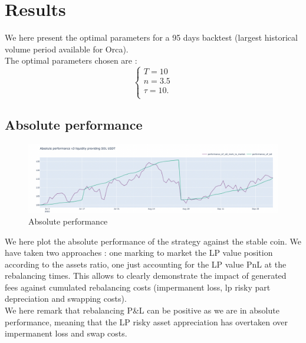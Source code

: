 \documentclass[conference]{IEEEtran}
\begin{document}
\section{Results}\label{result}
We here present the optimal parameters for a 95 days backtest (largest historical volume period available for Orca).\\
The optimal parameters chosen are :
\begin{equation}
\left\{\begin{array}{lll}
T = 10\\
n = 3.5\\
\tau = 10.\\
\end{array}
\right.
\end{equation}
\subsection{Absolute performance}
\begin{figure}[h!]
    \centering
    \includegraphics[scale=0.2]{Plots/absolute_lp_perf.png}
    \caption{Absolute performance}
    \label{fig:conc_liquidity}
\end{figure}
We here plot the absolute performance of the strategy against the stable coin. We have taken two approaches : one marking to market the LP value position according to the assets ratio, one just accounting for the LP value PnL at the rebalancing times. This allows to clearly demonstrate the impact of generated fees against cumulated rebalancing costs (impermanent loss, lp risky part depreciation and swapping costs).\\
We here remark that rebalancing P&L can be positive as we are in absolute performance, meaning that the LP risky asset appreciation has overtaken over impermanent loss and swap costs.
\end{document}
